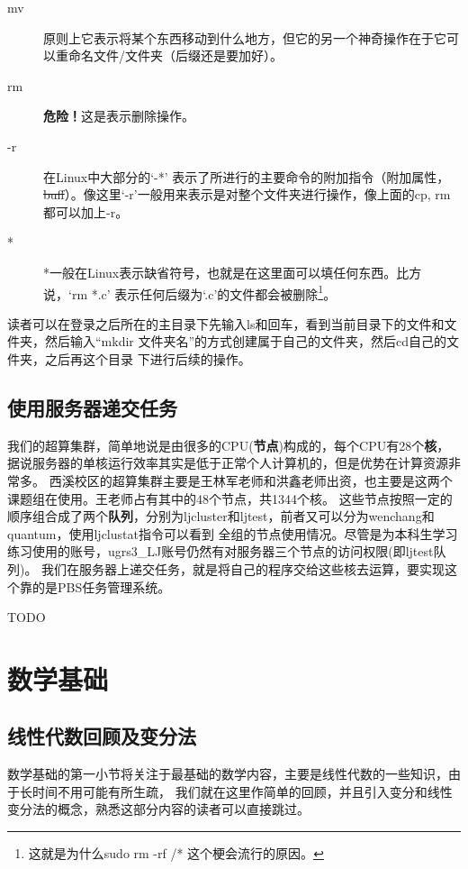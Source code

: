 \documentclass{article}
\numberwithin{equation}{section}
\begin{document}
\begin{description}
    \item[mv] 原则上它表示将某个东西移动到什么地方，但它的另一个神奇操作在于它可以重命名文件/文件夹（后缀还是要加好）。

    \item[rm] \textbf{ 危险！}这是表示删除操作。

    \item[-r] 在Linux中大部分的`-*' 表示了所进行的主要命令的附加指令（附加属性，\sout{buff}）。像这里`-r'一般用来表示是对整个文件夹进行操作，像上面的cp, rm 都可以加上-r。

    \item[*] *一般在Linux表示缺省符号，也就是在这里面可以填任何东西。比方说，`rm *.c' 表示任何后缀为`.c'的文件都会被删除\footnote{这就是为什么sudo rm -rf /* 这个梗会流行的原因。}。

    \end{description}

    读者可以在登录之后所在的主目录下先输入ls和回车，看到当前目录下的文件和文件夹，然后输入“mkdir 文件夹名”的方式创建属于自己的文件夹，然后cd自己的文件夹，之后再这个目录
    下进行后续的操作。
    \subsection{使用服务器递交任务}
    我们的超算集群，简单地说是由很多的CPU(\textbf{节点})构成的，每个CPU有28个\textbf{核}，据说服务器的单核运行效率其实是低于正常个人计算机的，但是优势在计算资源非常多。
    西溪校区的超算集群主要是王林军老师和洪鑫老师出资，也主要是这两个课题组在使用。王老师占有其中的48个节点，共1344个核。
    这些节点按照一定的顺序组合成了两个\textbf{队列}，分别为ljcluster和ljtest，前者又可以分为wenchang和quantum，使用ljclustat指令可以看到
    全组的节点使用情况。尽管是为本科生学习练习使用的账号，ugrs3\_LJ账号仍然有对服务器三个节点的访问权限(即ljtest队列)。
    我们在服务器上递交任务，就是将自己的程序交给这些核去运算，要实现这个靠的是PBS任务管理系统。
    
    TODO

    \section{数学基础}
    \subsection{线性代数回顾及变分法}
    数学基础的第一小节将关注于最基础的数学内容，主要是线性代数的一些知识，由于长时间不用可能有所生疏，
    我们就在这里作简单的回顾，并且引入变分和线性变分法的概念，熟悉这部分内容的读者可以直接跳过。
\end{document}
